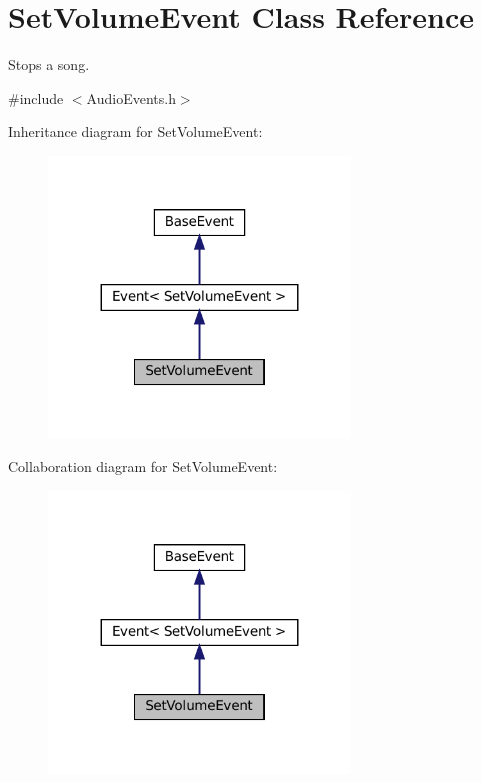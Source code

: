 \hypertarget{classSetVolumeEvent}{}\section{Set\+Volume\+Event Class Reference}
\label{classSetVolumeEvent}


Stops a song.  




{\ttfamily \#include $<$Audio\+Events.\+h$>$}



Inheritance diagram for Set\+Volume\+Event\+:
\nopagebreak
\begin{figure}[H]
\begin{center}
\leavevmode
\includegraphics[width=227pt]{classSetVolumeEvent__inherit__graph}
\end{center}
\end{figure}


Collaboration diagram for Set\+Volume\+Event\+:
\nopagebreak
\begin{figure}[H]
\begin{center}
\leavevmode
\includegraphics[width=227pt]{classSetVolumeEvent__coll__graph}
\end{center}
\end{figure}
